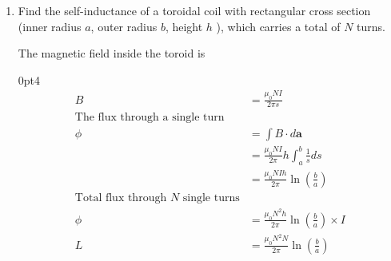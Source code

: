 \begin{enumerate}[ label=\color{ocre}\textbf{\arabic*.}]
\begin{answer}
{			\centering\texttt{[image: diagram-20210426(7)-crop]}}
		\begin{cutout}{3}{\dimexpr\linewidth-12cm\relax}{0pt}{4}
			\begin{align*}
			\oint E\cdot dl&=-\int\frac{d}{dl}B.da\\
			&=\frac{-d \phi}{dt}\\
			\oint B\cdot da&=\mu_{0}I(t)\times\pi a^2\\
			E\times2\pi s&=\mu_{0} n\times\pi a^2 \frac{dI}{dt}\\
			E&=\frac{-\mu_{0}n a^2}{2 s} \frac{dI}{dt}\hat{\phi}
			\end{align*}
		\end{cutout}
	\end{answer}
	\item Find the self-inductance of a toroidal coil with rectangular cross section (inner radius $a$, outer radius $b$, height $h$ ), which carries a total of $N$ turns.
	\begin{answer}
		The magnetic field inside the toroid is\\ 
		\opencutright
		\renewcommand\windowpagestuff{
			\centering\texttt{[image: diagram-20210426(4)-crop]}}
		\begin{cutout}{3}{\dimexpr\linewidth-7cm\relax}{0pt}{4}
			\begin{align*}
			B&=\frac{\mu_{0}N I}{2\pi s}\\
			\text{The flux through a single turn}\\
			\phi&=\int {B} \cdot d \mathbf{a}\\
			&=\frac{\mu_{0} N I}{2 \pi} h \int_{a}^{b} \frac{1}{s} d s\\
			&=\frac{\mu_{0} N I h}{2 \pi} \ln \left(\frac{b}{a}\right)\\
			\text{Total flux through $N$ single turns}\\
			\phi&=\frac{\mu_{0} N^{2} h}{2 \pi} \ln \left(\frac{b}{a}\right)\times I\\
			L&=\frac{\mu_{0} N^{2}  N}{2 \pi} \ln \left(\frac{b}{a}\right)
			\end{align*}
		\end{cutout}
		

\end{answer}
\end{enumerate}
